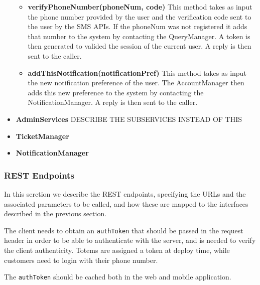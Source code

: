 \begin{itemize}
\begin{itemize}
        \item \textbf{verifyPhoneNumber(phoneNum, code)}
        This method takes as input the phone number provided by the user and the verification code sent to the user by the SMS APIs. If the phoneNum was not registered it adds that number to the system by contacting the QueryManager.
        A token is then generated to valided the session of the current user. A reply is then sent to the caller. 

        \item \textbf{addThisNotification(notificationPref)}
        This method takes as input the new notification preference of the user. The AccountManager then adds this new preference to the system by contacting the NotificationManager. A reply is then sent to the caller. 
    \end{itemize}

    \item \textbf{AdminServices} DESCRIBE THE SUBSERVICES INSTEAD OF THIS
    
    \item \textbf{TicketManager}

    \item \textbf{NotificationManager}
\end{itemize}

\subsubsection{REST Endpoints}

In this serction we describe the REST endpoints, specifying the URLs and the associated parameters to be called, and how these are mapped to the interfaces described in the previous section.

The client needs to obtain an \texttt{authToken} that should be passed in the request header in order to be able to authenticate with the server, and is needed to verify the client authenticity.
Totems are assigned a token at deploy time, while customers need to login with their phone number.

The \texttt{authToken} should be cached both in the web and mobile application.

